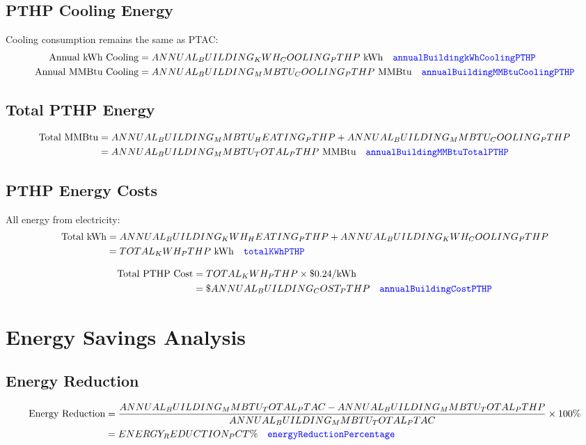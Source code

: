 \documentclass[11pt,letterpaper]{article}
\newcommand{\code}[1]{\textcolor{blue}{\texttt{#1}}}
\begin{document}
\subsection{PTHP Cooling Energy}
Cooling consumption remains the same as PTAC:
\begin{align}
\text{Annual kWh Cooling} &= {{ANNUAL_BUILDING_KWH_COOLING_PTHP}} \text{ kWh} \quad \code{annualBuildingkWhCoolingPTHP} \\
\text{Annual MMBtu Cooling} &= {{ANNUAL_BUILDING_MMBTU_COOLING_PTHP}} \text{ MMBtu} \quad \code{annualBuildingMMBtuCoolingPTHP}
\end{align}

\subsection{Total PTHP Energy}
\begin{align}
\text{Total MMBtu} &= {{ANNUAL_BUILDING_MMBTU_HEATING_PTHP}} + {{ANNUAL_BUILDING_MMBTU_COOLING_PTHP}} \\
&= {{ANNUAL_BUILDING_MMBTU_TOTAL_PTHP}} \text{ MMBtu} \quad \code{annualBuildingMMBtuTotalPTHP}
\end{align}

\subsection{PTHP Energy Costs}
All energy from electricity:
\begin{align}
\text{Total kWh} &= {{ANNUAL_BUILDING_KWH_HEATING_PTHP}} + {{ANNUAL_BUILDING_KWH_COOLING_PTHP}} \\
&= {{TOTAL_KWH_PTHP}} \text{ kWh} \quad \code{totalKWhPTHP}
\end{align}

\begin{align}
\text{Total PTHP Cost} &= {{TOTAL_KWH_PTHP}} \times \$0.24/\text{kWh} \\
&= \${{ANNUAL_BUILDING_COST_PTHP}} \quad \code{annualBuildingCostPTHP}
\end{align}

\section{Energy Savings Analysis}

\subsection{Energy Reduction}
\begin{align}
\text{Energy Reduction} &= \frac{{{ANNUAL_BUILDING_MMBTU_TOTAL_PTAC}} - {{ANNUAL_BUILDING_MMBTU_TOTAL_PTHP}}}{{{ANNUAL_BUILDING_MMBTU_TOTAL_PTAC}}} \times 100\% \\
&= {{ENERGY_REDUCTION_PCT}}\% \quad \code{energyReductionPercentage}
\end{align}
\end{document}
